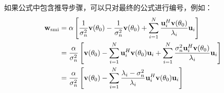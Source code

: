 %

如果公式中包含推导步骤，可以只对最终的公式进行编号，例如：
\begin{align}
	\mathbf{w}_{\mathrm{smi}} &= \alpha \left[\frac{1}{\sigma_n^2}\mathbf{v}(\theta_0) - \frac{1}{\sigma_n^2}\mathbf{v}(\theta_0) + \sum_{i=1}^{N} \frac{\mathbf{u}_i^H\mathbf{v}(\theta_0)}{\lambda_i} \mathbf{u}_i\right] \nonumber \\
	&= \frac{\alpha}{\sigma_n^2} \left[\mathbf{v}(\theta_0) - \sum_{i=1}^{N}\mathbf{u}_i^H\mathbf{v}(\theta_0)\mathbf{u}_i +  \sum_{i=1}^{N}\frac{\sigma_n^2\mathbf{u}_i^H\mathbf{v}(\theta_0)}{\lambda_i} \mathbf{u}_i \right] \nonumber \\
	&= \frac{\alpha}{\sigma_n^2} \left[\mathbf{v}(\theta_0) - \sum_{i=1}^{N} \frac{\lambda_i-\sigma_n^2}{\lambda_i} \mathbf{u}_i^H\mathbf{v}(\theta_0)\mathbf{u}_i \right]
\end{align}
